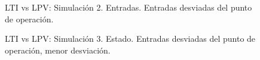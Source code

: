 \documentclass[a4paper, 10pt, onecolumn,journal]{ieeeconf}
\begin{document}
\begin{figure}[thpb]
	\centering
	\begin{adjustbox}{max width=\columnwidth}
	\end{adjustbox}
	\caption{LTI vs LPV: Simulación 2. Entradas. Entradas desviadas del punto de operación.}
	\label{simulación 2 entradas}
\end{figure}

\begin{figure}[thpb]
	\centering
	\begin{adjustbox}{max width=\columnwidth}
	\end{adjustbox}
	\caption{LTI vs LPV: Simulación 3. Estado. Entradas desviadas del punto de operación, menor desviación.}
	\label{simulación 3 estado}
\end{figure}
\end{document}

